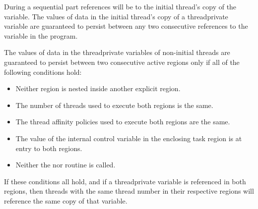 During a sequential part references will be to the initial thread's copy of the variable.
The values of data in the initial thread's copy of a threadprivate variable are guaranteed
to persist between any two consecutive references to the variable in the program.

The values of data in the threadprivate variables of non-initial threads
are guaranteed to persist between two consecutive active 
regions only if all of the following conditions hold:

\begin{itemize}  %
\item Neither  region is nested inside another explicit  region.

\item The number of threads used to execute both  regions is the same.

\item The thread affinity policies used to execute both  regions are the same.

\item The value of the  internal control variable in the enclosing task region is 
at entry to both  regions.

\item Neither the  nor  routine is called.

\end{itemize} %

If these conditions all hold, and if a threadprivate variable is referenced in both regions,
then threads with the same thread number in their respective regions will reference the
same copy of that variable.

